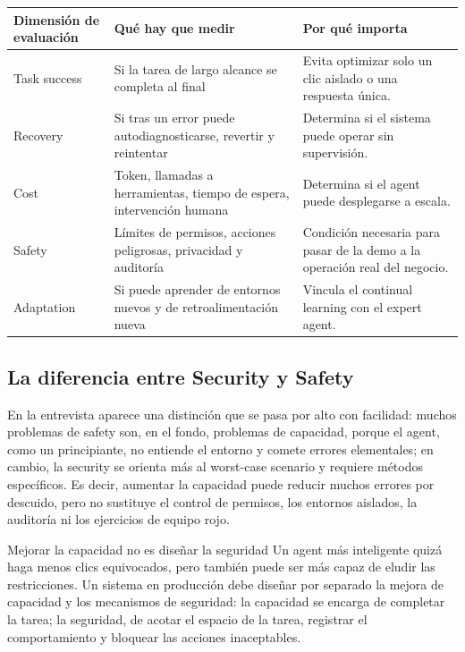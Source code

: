 \documentclass[a4paper]{article}
\begin{document}
\noindent\begin{tabularx}{\textwidth}{p{}p{}X}
\toprule
Dimensión de evaluación & Qué hay que medir & Por qué importa \\
\midrule
Task success & Si la tarea de largo alcance se completa al final & Evita optimizar solo un clic aislado o una respuesta única. \\
Recovery & Si tras un error puede autodiagnosticarse, revertir y reintentar & Determina si el sistema puede operar sin supervisión. \\
Cost & Token, llamadas a herramientas, tiempo de espera, intervención humana & Determina si el agent puede desplegarse a escala. \\
Safety & Límites de permisos, acciones peligrosas, privacidad y auditoría & Condición necesaria para pasar de la demo a la operación real del negocio. \\
Adaptation & Si puede aprender de entornos nuevos y de retroalimentación nueva & Vincula el continual learning con el expert agent. \\
\bottomrule
\end{tabularx}

\subsection{La diferencia entre Security y Safety}

En la entrevista aparece una distinción que se pasa por alto con facilidad: muchos problemas de safety son, en el fondo, problemas de capacidad, porque el agent, como un principiante, no entiende el entorno y comete errores elementales; en cambio, la security se orienta más al worst-case scenario y requiere métodos específicos. Es decir, aumentar la capacidad puede reducir muchos errores por descuido, pero no sustituye el control de permisos, los entornos aislados, la auditoría ni los ejercicios de equipo rojo.

\begin{warningbox}{Mejorar la capacidad no es diseñar la seguridad}
Un agent más inteligente quizá haga menos clics equivocados, pero también puede ser más capaz de eludir las restricciones. Un sistema en producción debe diseñar por separado la mejora de capacidad y los mecanismos de seguridad: la capacidad se encarga de completar la tarea; la seguridad, de acotar el espacio de la tarea, registrar el comportamiento y bloquear las acciones inaceptables.
\end{warningbox}
\end{document}
